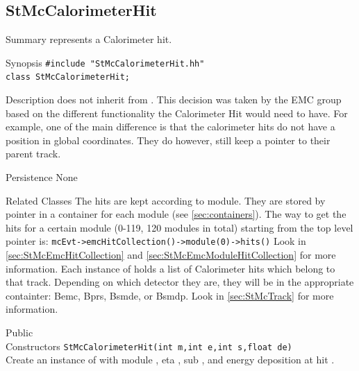 \subsection{StMcCalorimeterHit}
 
\label{sec:StMcCalorimeterHit}
\begin{Entry}
\item[Summary]
     represents a Calorimeter hit.

\item[Synopsis]
    \verb+#include "StMcCalorimeterHit.hh"+\\
    \verb+class StMcCalorimeterHit;+\\

\item[Description]
     does not inherit from .  This decision was
    taken by the EMC group based on the different functionality the Calorimeter Hit
    would need to have.  For example, one of the main difference is that the calorimeter hits
    do not have a position in global coordinates.  They do however, still keep a pointer to
    their parent track.

\item[Persistence]
    None

\item[Related Classes]
    The hits are kept according to module.
    They are stored by pointer in a container for each module
    (see \ref{sec:containers}).  The way to get the hits for a
    certain module (0-119, 120 modules in total) starting
    from the top level  pointer is:
    \verb+mcEvt->emcHitCollection()->module(0)->hits()+
    Look in \ref{sec:StMcEmcHitCollection} and
    \ref{sec:StMcEmcModuleHitCollection} for more information.
    Each instance of  holds a list of Calorimeter hits
    which belong to that track.  Depending on which detector they are, they
    will be in the appropriate containter: Bemc, Bprs, Bsmde, or Bsmdp.  Look
    in \ref{sec:StMcTrack} for more information.

\item[Public\\ Constructors]
    \verb+StMcCalorimeterHit(int m,int e,int s,float de)+\\
    Create an instance of  with module ,
    eta , sub , and energy deposition at hit .


\end{Entry}
